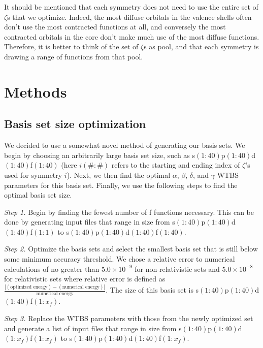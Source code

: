 It should be mentioned that each symmetry does not need to use the entire set of $\zeta$s that we optimize. Indeed, the most diffuse orbitals in the valence shells often don't use the most contracted functions at all, and conversely the most contracted orbitals in the core don't make much use of the most diffuse functions. Therefore, it is better to think of the set of $\zeta$s as pool, and that each symmetry is drawing a range of functions from that pool.  

\section{Methods}
\subsection{Basis set size optimization}
We decided to use a somewhat novel method of generating our basis sets. We begin by choosing an arbitrarily large basis set size, such as \mbox{s$(1:40)$p$(1:40)$d$(1:40)$f$(1:40)$} (here $i(\#:\#)$ refers to the starting and ending index of $\zeta$'s used for symmetry $i$). Next, we then find the optimal $\alpha$, $\beta$, $\delta$, and $\gamma$ WTBS parameters for this basis set.  Finally, we use the following steps to find the optimal basis set size.

\textit{Step 1.} Begin by finding the fewest number of f functions necessary. This can be done by generating input files that range in size from  \mbox{s$(1:40)$p$(1:40)$d$(1:40)$f$(1:1)$} to  \mbox{s$(1:40)$p$(1:40)$d$(1:40)$f$(1:40)$}.

\textit{Step 2.} Optimize the basis sets and select the smallest basis set that is still below some minimum accuracy threshold. We chose a relative error to numerical calculations of no greater than $5.0\times10^{-9}$ for non-relativistic sets and $5.0\times10^{-8}$ for relativistic sets where relative error is defined as $\frac{|(\text{optimized energy}) - (\text{numerical energy})|}{\text{numerical energy}}$. The size of this basis set is  \mbox{s$(1:40)$p$(1:40)$d$(1:40)$f$(1:x_{f})$}.

\textit{Step 3.} Replace the WTBS parameters with those from the newly optimized set and generate a list of input files that range in size from  \mbox{s$(1:40)$p$(1:40)$d$(1:x_{f})$f$(1:x_{f})$} to  \mbox{s$(1:40)$p$(1:40)$d$(1:40)$f$(1:x_{f})$}.

